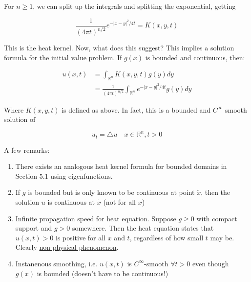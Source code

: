 \documentclass{article}
\newtheorem{one minute paper}[theorem]{One Minute Paper}
\begin{document}
For $n \geq 1$, we can split up the integrals and splitting the exponential, getting 

\begin{equation}
    \frac{1}{(4\pi t)^{n/2}}e^{-|x-y|^2/4t} = K(x,y,t)
\end{equation}

This is the heat kernel. Now, what does this suggest? This implies a solution formula for the initial value problem. If $g(x)$ is bounded and continuous, then:

\begin{align*}
    u(x,t) &= \int_{\mathbb{R}^n}K(x,y,t)g(y)dy \\
    &= \frac{1}{(4\pi t)^{n/2}}\int_{\mathbb{R}^n}e^{-|x-y|^2/4t} g(y)dy
\end{align*}

Where $K(x,y,t)$ is defined as above. In fact, this is a bounded and $C^{\infty}$ smooth solution of 

\begin{equation}
    u_t = \triangle u \quad x \in \mathbb{R}^n, t > 0
\end{equation}

A few remarks:

\begin{enumerate}
    \item There exists an analogous heat kernel formula for bounded domains in Section 5.1 using eigenfunctions. 
    \item If $g$ is bounded but is only known to be continuous at point $\tilde{x}$, then the solution $u$ is continuous at $\tilde{x}$ (not for all $x$)
    \item Infinite propagation speed for heat equation. Suppose $g \geq 0$ with compact support and $g> 0$ somewhere. Then the heat equation states that $u(x,t)> 0$ is positive for all $x$ and $t$, regardless of 
    how small $t$ may be. Clearly \underline{non-physical phenomenon}. 
    \item Instanenous smoothing, i.e. $u(x,t)$ is $C^{\infty}$-smooth $\forall t > 0$ even though $g(x)$ is bounded (doesn't have to be continuous!) 
\end{enumerate}
\end{document}

